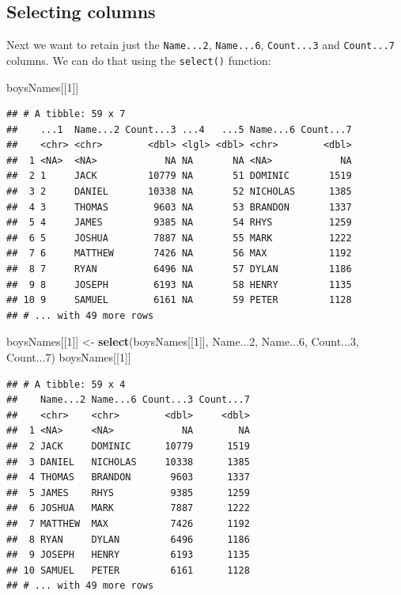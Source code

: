 \documentclass[
]{book}
\newenvironment{Shaded}{\begin{snugshade}}{\end{snugshade}}
\newcommand{\DecValTok}[1]{\textcolor[rgb]{0.00,0.00,0.81}{#1}}
\newcommand{\KeywordTok}[1]{\textcolor[rgb]{0.13,0.29,0.53}{\textbf{#1}}}
\newcommand{\NormalTok}[1]{#1}
\newcommand{\StringTok}[1]{\textcolor[rgb]{0.31,0.60,0.02}{#1}}
\begin{document}
\hypertarget{selecting-columns}{%
\subsection{Selecting columns}\label{selecting-columns}}

Next we want to retain just the \texttt{Name...2}, \texttt{Name...6}, \texttt{Count...3} and \texttt{Count...7} columns.
We can do that using the \texttt{select()} function:

\begin{Shaded}
\begin{Highlighting}[]
\NormalTok{boysNames[[}\DecValTok{1}\NormalTok{]]}
\end{Highlighting}
\end{Shaded}

\begin{verbatim}
## # A tibble: 59 x 7
##    ...1  Name...2 Count...3 ...4   ...5 Name...6 Count...7
##    <chr> <chr>        <dbl> <lgl> <dbl> <chr>        <dbl>
##  1 <NA>  <NA>            NA NA       NA <NA>            NA
##  2 1     JACK         10779 NA       51 DOMINIC       1519
##  3 2     DANIEL       10338 NA       52 NICHOLAS      1385
##  4 3     THOMAS        9603 NA       53 BRANDON       1337
##  5 4     JAMES         9385 NA       54 RHYS          1259
##  6 5     JOSHUA        7887 NA       55 MARK          1222
##  7 6     MATTHEW       7426 NA       56 MAX           1192
##  8 7     RYAN          6496 NA       57 DYLAN         1186
##  9 8     JOSEPH        6193 NA       58 HENRY         1135
## 10 9     SAMUEL        6161 NA       59 PETER         1128
## # ... with 49 more rows
\end{verbatim}

\begin{Shaded}
\begin{Highlighting}[]
\NormalTok{boysNames[[}\DecValTok{1}\NormalTok{]] \textless{}{-}}\StringTok{ }\KeywordTok{select}\NormalTok{(boysNames[[}\DecValTok{1}\NormalTok{]], Name...}\DecValTok{2}\NormalTok{, Name...}\DecValTok{6}\NormalTok{, Count...}\DecValTok{3}\NormalTok{, Count...}\DecValTok{7}\NormalTok{)}
\NormalTok{boysNames[[}\DecValTok{1}\NormalTok{]]}
\end{Highlighting}
\end{Shaded}

\begin{verbatim}
## # A tibble: 59 x 4
##    Name...2 Name...6 Count...3 Count...7
##    <chr>    <chr>        <dbl>     <dbl>
##  1 <NA>     <NA>            NA        NA
##  2 JACK     DOMINIC      10779      1519
##  3 DANIEL   NICHOLAS     10338      1385
##  4 THOMAS   BRANDON       9603      1337
##  5 JAMES    RHYS          9385      1259
##  6 JOSHUA   MARK          7887      1222
##  7 MATTHEW  MAX           7426      1192
##  8 RYAN     DYLAN         6496      1186
##  9 JOSEPH   HENRY         6193      1135
## 10 SAMUEL   PETER         6161      1128
## # ... with 49 more rows
\end{verbatim}
\end{document}
